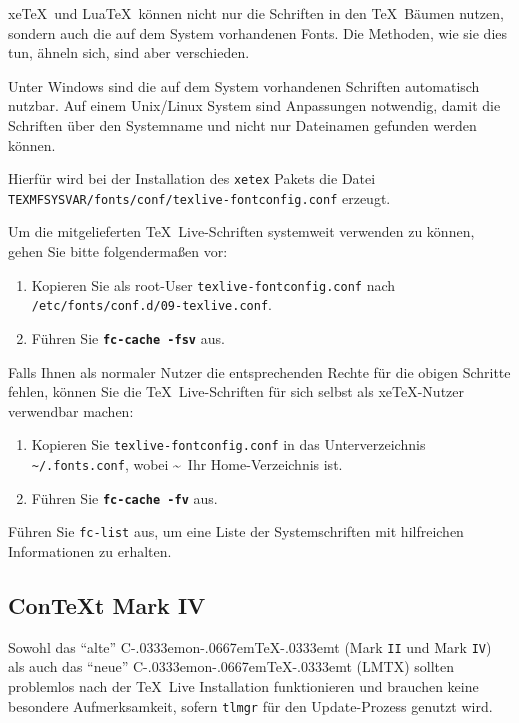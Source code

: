 \documentclass[12pt,ngerman,a4paper,fullparskip]{scrreprt}
\newcommand{\TL}{\TeX\ Live\xspace}
\newcommand{\acro}[1]{\texttt{#1}}
\newcommand{\code}[1]{\texttt{#1}}
\newcommand{\filename}[1]{\texttt{#1}}
\newcommand{\dirname}[1]{\texttt{#1}}
\newcommand{\Ucom}[1]{\textbf{\texttt{#1}}}
\newcommand\ConTeXt{C\kern-.0333emon\-\kern-.0667em\TeX\kern-.0333emt}
\providecommand*{\XeTeX}{xe\TeX\xspace}
\begin{document}
\XeTeX\  und Lua\TeX\ können nicht nur die Schriften in den \TeX\ Bäumen nutzen, sondern auch die auf dem System vorhandenen Fonts. Die Methoden, wie sie dies tun, ähneln sich, sind aber verschieden.

Unter Windows sind die auf dem System vorhandenen Schriften automatisch nutzbar. Auf einem Unix/Linux System sind Anpassungen notwendig, damit die Schriften über den Systemname und nicht nur Dateinamen gefunden werden können.

Hierfür wird bei der Installation des \filename{xetex} Pakets die Datei \newline  \filename{TEXMFSYSVAR/fonts/conf/texlive-fontconfig.conf}
erzeugt.

Um die mitgelieferten \TL-Schriften systemweit verwenden zu können,
gehen Sie bitte folgendermaßen vor:

\begin{enumerate}
\item Kopieren Sie als root-User \filename{texlive-fontconfig.conf} nach \newline
\dirname{/etc/fonts/conf.d/09-texlive.conf}.
\item Führen Sie \Ucom{fc-cache -fsv} aus. 
\end{enumerate}

\noindent Falls Ihnen als normaler Nutzer die entsprechenden Rechte für die
obigen Schritte fehlen, können Sie die \TL-Schriften für sich selbst
als \XeTeX-Nutzer verwendbar machen:

\begin{enumerate}
\item Kopieren Sie \filename{texlive-fontconfig.conf} in das Unterverzeichnis
      \filename{\textasciitilde/.fonts.conf}, wobei \textasciitilde\ Ihr Home-Verzeichnis ist.
\item Führen Sie \Ucom{fc-cache -fv} aus.
\end{enumerate}

Führen Sie \code{fc-list} aus, um eine Liste der Systemschriften mit hilfreichen Informationen zu erhalten.

\subsection{Con\TeX t Mark IV}
\label{sec:context-mkiv}

Sowohl das \enquote{alte} \ConTeXt{} (Mark \acro{II} und Mark \acro{IV}) als auch das \enquote{neue} \ConTeXt{} (LMTX) sollten problemlos nach der \TL{} Installation funktionieren und brauchen keine besondere Aufmerksamkeit, sofern \verb+tlmgr+ für den Update-Prozess genutzt wird.
\end{document}
